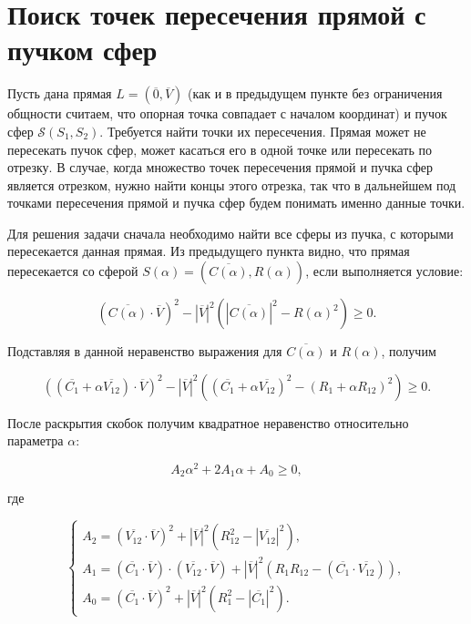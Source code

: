 \documentclass[a4paper,10pt]{extarticle}                     %
\numberwithin{equation}{section}                             %
\numberwithin{figure}{section}                               %
\theoremstyle{plain}                                         %
\begin{document}
\section{Поиск точек пересечения прямой с пучком сфер}

Пусть дана прямая $L = (\overline{0}, \overline{V})$ (как и в предыдущем пункте без ограничения общности считаем, что опорная точка совпадает с началом координат) и пучок сфер $\mathcal{S}(S_1, S_2)$.
Требуется найти точки их пересечения.
Прямая может не пересекать пучок сфер, может касаться его в одной точке или пересекать по отрезку.
В случае, когда множество точек пересечения прямой и пучка сфер является отрезком, нужно найти концы этого отрезка, так что в дальнейшем под точками пересечения прямой и пучка сфер будем понимать именно данные точки.

Для решения задачи сначала необходимо найти все сферы из пучка, с которыми пересекается данная прямая.
Из предыдущего пункта видно, что прямая пересекается со сферой $S(\alpha) = (\overline{C(\alpha)}, R(\alpha))$, если выполняется условие:

\begin{equation}
    (\overline{C(\alpha)}\cdot\overline{V})^2 - {|\overline{V}|}^2({|\overline{C(\alpha)}|}^2 - R(\alpha)^2) \ge 0.
\end{equation}

Подставляя в данной неравенство выражения для $\overline{C(\alpha)}$ и $R(\alpha)$, получим

\begin{equation}
    \left((\overline{C_1} + \alpha\overline{V_{12}})\cdot\overline{V}\right)^2 - {|\overline{V}|}^2\left((\overline{C_1} + \alpha\overline{V_{12}})^2 - (R_1 + \alpha R_{12})^2\right) \ge 0.
\end{equation}

После раскрытия скобок получим квадратное неравенство относительно параметра $\alpha$:

\begin{equation}
    A_2 \alpha^2 + 2A_1 \alpha + A_0 \ge 0,
\end{equation}

где

\begin{equation}
    \begin{cases}
        A_2 = (\overline{V_{12}}\cdot\overline{V})^2 + |\overline{V}|^2(R_{12}^2 - |\overline{V_{12}}|^2), \\
        A_1 = (\overline{C_1}\cdot\overline{V})\cdot(\overline{V_{12}}\cdot\overline{V}) + |\overline{V}|^2(R_1R_{12} - (\overline{C_1}\cdot\overline{V_{12}})), \\
        A_0 = (\overline{C_1}\cdot\overline{V})^2 + |\overline{V}|^2(R_1^2 - |\overline{C_1}|^2).
    \end{cases}
\end{equation}
\end{document}
